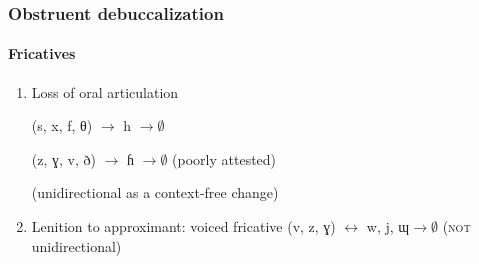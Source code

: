 \documentclass[xcolor=table]{beamer}
\begin{document}
  \begin{frame} 
\frametitle{Obstruent debuccalization} 
\framesubtitle{Fricatives} 
\begin{enumerate}[<+->]

 
\item Loss of oral articulation 
  
  
  (s, x, f, θ) $\rightarrow$ h $\rightarrow \emptyset$ 

  (z, ɣ, v, ð) $\rightarrow$ ɦ $\rightarrow \emptyset$ (poorly attested)
  
  (unidirectional as a context-free change)
  
\item Lenition to approximant:
  voiced fricative (v, z, ɣ) $\leftrightarrow$  w, j, ɰ$\rightarrow \emptyset$ (\textsc{not} unidirectional)
 

\end{enumerate}
   \end{frame}    
   
\end{document}
